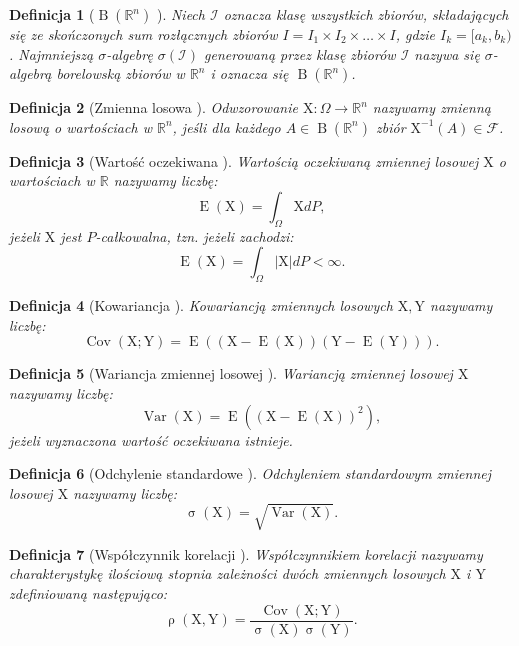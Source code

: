 \documentclass[12pt,a4paper]{report}
\newtheorem{df}{Definicja}[chapter]
\newcommand{\setR}{\mathbb{R}}
\newcommand{\ro}[2]{\operatorname{\rho}\left( {#1},{#2} \right)}
\newcommand{\Covariance}[2]{\operatorname{Cov}\left({#1}; {#2} \right)}
\newcommand{\variance}[1]{\operatorname{Var}\left({#1} \right)}
\newcommand{\e}[1]{\operatorname{E}\left({#1} \right)}
\newcommand{\standard}[1]{\operatorname{\sigma}\left({#1} \right)}
\newcommand{\sigmacialo}[1]{\operatorname{B}\left({#1} \right)}
\begin{document}
\begin{df}[$\sigmacialo{\setR^n}$ {\citep[Sec 1.12]{wztp}}]
Niech $\mathcal{I}$ oznacza klasę wszystkich zbiorów, składających się ze skończonych sum rozłącznych zbiorów $\mathit{I} = \mathit{I}_1 \times \mathit{I}_2 \times \ldots \times \mathit{I}$, gdzie $\mathit{I}_k = [a_k,b_k)$.
Najmniejszą $\sigma$-algebrę $\sigma(\mathcal{I})$ generowaną przez klasę zbiorów $\mathcal{I}$ nazywa się $\sigma$-algebrą borelowską zbiorów w $\setR^n$ i oznacza się $\sigmacialo{\setR^n}$.
\end{df}

\begin{df}[Zmienna losowa {\citep[Sec 5.1 Def. 1]{jakubowski}}]
Odwzorowanie $\mathrm{X}: \Omega \to \setR^n$ nazywamy zmienną losową o wartościach w $\setR^n$, jeśli dla każdego $\mathit{A} \in \sigmacialo{\setR^n}$ zbiór $\mathrm{X}^{-1}(\mathit{A}) \in \mathcal{F}$.
\end{df}

\begin{df}[Wartość oczekiwana {\citep[Sec 5.6 Def. 2]{jakubowski}}]
Wartością oczekiwaną zmiennej losowej $\mathrm{X}$ o wartościach w $\setR$ nazywamy liczbę:
$$
\e{\mathrm{X}} = \int_{\Omega} \mathrm{X} dP,
$$
jeżeli $\mathrm{X}$ jest $P$-całkowalna, tzn. jeżeli zachodzi:
$$
\e{\mathrm{X}} = \int_{\Omega} |\mathrm{X}| dP < \infty.
$$
\end{df}
\begin{df}[Kowariancja {\citep[Sec 2.8 Def.2.32]{wztp}}]
Kowariancją zmiennych losowych $\mathrm{X},\mathrm{Y}$ nazywamy liczbę:
$$
\Covariance{\mathrm{X}}{\mathrm{Y}} = \e{(\mathrm{X}-\e{\mathrm{X}})(\mathrm{Y}-\e{\mathrm{Y}})}.
$$
\end{df}

\begin{df}[Wariancja zmiennej losowej {\citep[Sec 2.8 Def.2.28]{wztp}}]
Wariancją zmiennej losowej $\mathrm{X}$ nazywamy liczbę:
$$
\variance{\mathrm{X}}=\e{(\mathrm{X}-\e{\mathrm{X}})^2},
$$
jeżeli wyznaczona wartość oczekiwana istnieje.
\end{df} 
\begin{df}[Odchylenie standardowe {\citep[Sec 2.8 Def.2.28]{wztp}}]
Odchyleniem standardowym zmiennej losowej $\mathrm{X}$ nazywamy liczbę:
$$
\standard{\mathrm{X}}=\sqrt{\variance{\mathrm{X}}}.
$$
\end{df}
\begin{df}[Współczynnik korelacji {\citep{wztp}}]
Współczynnikiem korelacji nazywamy charakterystykę ilościową stopnia zależności dwóch zmiennych losowych $\mathrm{X}$ i $\mathrm{Y}$ zdefiniowaną następująco:
$$
\ro{\mathrm{X}}{\mathrm{Y}} = \frac{\Covariance{\mathrm{X}}{\mathrm{Y}}}{\standard{\mathrm{X}} \standard{\mathrm{Y}}}.
$$
\end{df}
\end{document}
